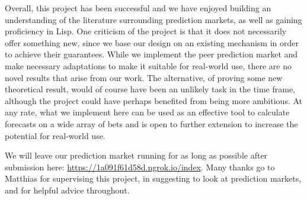 Overall, this project has been successful and we have enjoyed building an
understanding of the literature surrounding prediction markets, as well as
gaining proficiency in Lisp. One criticism of the project is that it does not
necessarily offer something new, since we base our design on an existing
mechanism in order to achieve their guarantees. While we implement the peer
prediction market and make necessary adaptations to make it suitable for
real-world use, there are no novel results that arise from our work. The
alternative, of proving some new theoretical result, would of course have been
an unlikely task in the time frame, although the project could have perhaps
benefited from being more ambitious. At any rate, what we implement here can be
used as an effective tool to calculate forecasts on a wide array of bets and is
open to further extension to increase the potential for real-world use.

We will leave our prediction market running for as long as possible after
submission here: \url{https://1a091f61d58d.ngrok.io/index}. Many thanks go to
Matthias for supervising this project, in suggesting to look at prediction
markets, and for helpful advice throughout.

